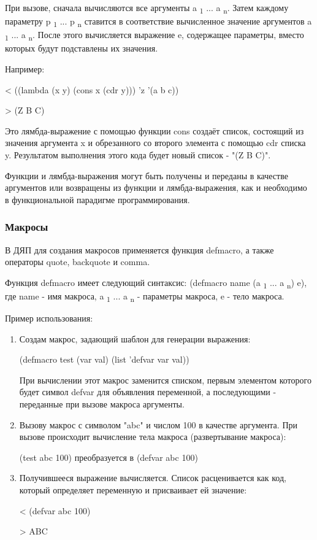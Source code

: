 При вызове, сначала вычисляются все аргументы a \textsubscript 1 ... a \textsubscript n. Затем каждому параметру p \textsubscript 1 ... p \textsubscript n ставится в соответствие вычисленное значение аргументов a \textsubscript 1 ... a \textsubscript n. После этого вычисляется выражение e, содержащее параметры, вместо которых будут подставлены их значения.

Например:

< ((lambda (x y) (cons x (cdr y))) 'z '(a b c))

> (Z B C)

Это лямбда-выражение с помощью функции cons создаёт список, состоящий из значения аргумента x и обрезанного со второго элемента с помощью cdr списка y. Результатом выполнения этого кода будет новый список - "(Z B C)".

Функции и лямбда-выражения могут быть получены и переданы в качестве аргументов или возвращены из функции и лямбда-выражения, как и необходимо в функциональной парадигме программирования.




















\subsubsection{Макросы}

В ДЯП для создания макросов применяется функция defmacro, а также операторы quote, backquote и comma.

Функция defmacro имеет следующий синтаксис:
(defmacro name (a \textsubscript 1 ... a \textsubscript n) e), где name - имя макроса, a \textsubscript 1 ... a \textsubscript n - параметры макроса, e - тело макроса.

Пример использования:

\begin{enumerate}
	\item Создам макрос, задающий шаблон для генерации выражения:
	
	(defmacro test (var val) (list 'defvar var val))
	
	При вычислении этот макрос заменится списком, первым элементом которого будет символ defvar для объявления переменной, а последующими - переданные при вызове макроса аргументы.
	
	\item Вызову макрос с символом "abc" и числом 100 в качестве аргумента. При вызове происходит вычисление тела макроса (развертывание макроса):
	
	(test abc 100) преобразуется в (defvar abc 100)
	
	\item Получившееся выражение вычисляется. Список расценивается как код, который определяет переменную и присваивает ей значение:
	
	< (defvar abc 100)
	
	> ABC
\end{enumerate}

